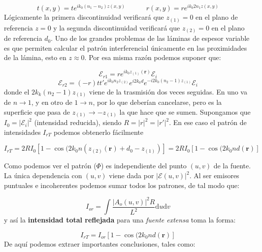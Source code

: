 \documentclass[12pt,a4paper]{book}
\numberwithin{equation}{section}
\numberwithin{figure}{section}
\newcommand{\tquad}{\quad \quad \quad}
\newcommand{\ccorchetes}[1]{\left[ #1  \right]}
\newcommand{\D}{\mathrm{d}}
\newcommand{\1}{_{(1)}}
\newcommand{\2}{_{(2)}}
\newcommand{\rn}{\mathbf{r}}
\newcommand{\Ecal}{\mathcal{E}}
\theoremstyle{definition}
\begin{document}
\begin{equation}
t(x,y) = t e^{ik_0 (n_1-n_2) z(x,y)} \tquad r(x,y) = re^{ik_0 2 n_1 z(x,y)}
\end{equation}
Lógicamente la primera discontinuidad verificará que $z_{(1)}=0$ en el plano de referencia $z=0$ y la segunda discontinuidad verificará que $z_{(2)}=0$ en el plano de referencia $d_0$. Uno de los grandes problemas de las láminas de espesor variable es que permiten calcular el patrón interferencial únicamente en las proximidades de la lámina, esto en $z\approx 0$. Por esa misma razón podemos suponer que:

\begin{equation}
\Ecal_{r1} = r e^{ik_0 z_{(1)}(\rn)} \Ecal_i
\end{equation}
\begin{equation}
\Ecal_{r2} = (-r)tt' e^{ik_0n_2z_{(2)}}e^{i2k_0d}e^{-i2k_0(n_2-1)z_{(1)}} \Ecal_i
\end{equation}
donde el $2k_k(n_2-1)z_{(1)}$ viene de la trasmisión dos veces seguidas. En uno va de $n\rightarrow 1$, y en otro de $1 \rightarrow n$, por lo que deberían cancelarse, pero es la superficie que pasa de $z_{(1)} \rightarrow - z_{(1)}$ la que hace que se sumen. Supongamos que $I_0=|\mathcal{E}_i|^2$ (intensidad reducida), siendo $R=|r|^2=|r'|^2$. En ese caso el patrón de intensidades $I_{rT}$ podemos obtenerlo fácilmente

\begin{equation}
I_{rT} = 2R I_0 \ccorchetes{1-\cos( 2k_0n(z_{(2)}(\rn)+d_0-z_{(1)})} = 2 R I_0 \ccorchetes{1-\cos (2k_0nd(\rn)}
\end{equation}

Como podemos ver el patrón ($\Phi$) es independiente del punto $(u,v)$ de la fuente. La única dependencia con $(u,v)$ viene dada por $|\Ecal (u,v)|^2$. Al ser emisores puntuales e incoherentes podemos sumar todos los patrones, de tal modo que:

\begin{equation}
I_{or} = \int \frac{|A_o (u,v)|^2 R}{L^2} \D u \D v
\end{equation}
y así la \textbf{intensidad total reflejada} para una \textit{fuente extensa} toma la forma:

\begin{equation}
I_{rT} = I_{or} \ccorchetes{1-\cos (2k_0nd(\rn)}
\end{equation}
De aquí podemos extraer importantes conclusiones, tales como:
\end{document}
